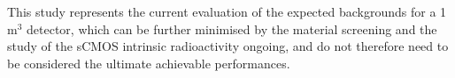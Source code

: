 \documentclass[physics,article,submit,moreauthors,pdftex]{Definitions/mdpi}
\begin{document}
This study represents the current evaluation of the expected backgrounds for a 1 m$^3$ detector, which can be further minimised by the material screening and the study of the sCMOS intrinsic radioactivity ongoing, and do not therefore need to be considered the ultimate achievable performances.






~%
\end{document}
